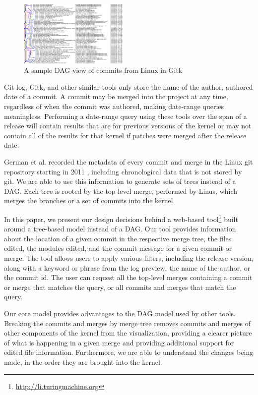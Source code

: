 \documentclass[conference, draftclsnofoot]{IEEEtran}
\begin{document}
\begin{figure}
        \centering
        \includegraphics[width=0.47\textwidth]{figures/gitk.png}
        \caption{A sample DAG view of commits from Linux in Gitk}
        \label{fig:gitk}
\end{figure}

Git log, Gitk, and other similar tools only store the name of the author, authored
date of a commit. A commit may be merged into the project at any time, regardless of
when the commit was authored, making date-range queries meaningless. Performing a
date-range query using these tools over the span of a release will contain results
that are for previous versions of the kernel or may not contain all of the results
for that kernel if patches were merged after the release date.

German et al. recorded the metadata of every commit and merge in the Linux git
repository starting in 2011 \cite{German}, including chronological data that is
not stored by git. We are able to use this information to generate sets of
trees instead of a DAG. Each tree is rooted by the top-level merge, performed
by Linus, which merges the branches or a set of commits into the kernel.

In this paper, we present our design decisions behind a web-based
tool\footnote{\url{http://li.turingmachine.org}} built around a tree-based
model instead of a DAG. Our tool provides information about the location of a
given commit in the respective merge tree, the files edited, the modules
edited, and the commit message for a given commit or merge. The tool allows
users to apply various filters, including the release version, along with a
keyword or phrase from the log preview, the name of the author, or the commit
id. The user can request all the top-level merges containing a commit or merge
that matches the query, or all commits and merges that match the query.

Our core model provides advantages to the DAG model used by other tools.
Breaking the commits and merges by merge tree removes commits and merges of
other components of the kernel from the visualization, providing a clearer
picture of what is happening in a given merge and providing additional
support for edited file information. Furthermore, we are able to understand the
changes being made, in the order they are brought into the kernel.
\end{document}
